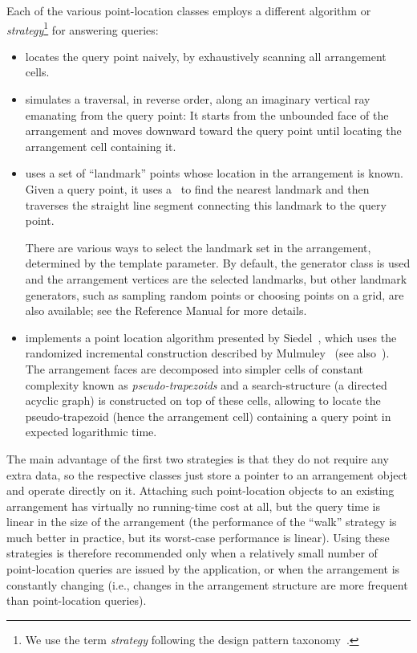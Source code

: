 Each of the various point-location classes employs a different
algorithm or {\em strategy}\footnote{We use the term {\em strategy}
following the design pattern taxonomy~\cite{cgal:ghjv-dpero-95}.}
for answering queries:
\begin{itemize}
\item {} locates the query
point naively, by exhaustively scanning all arrangement cells.
%
\item {}
simulates a traversal, in reverse order, along an imaginary vertical
ray emanating
from the query point: It starts from the unbounded face of the
arrangement and moves downward toward the query point until
locating the arrangement cell containing it.
%
\item {}
uses a set of ``landmark'' points whose location in the
arrangement is known. Given a query point, it uses a \kdtree\ to
find the nearest landmark and then traverses the straight line
segment connecting this landmark to the query point.

There are various ways to select the landmark set in the
arrangement, determined by the  template parameter.
By default, the generator
class  is used and the
arrangement vertices are the selected landmarks, but other
landmark generators, such as sampling random points or
choosing points on a grid, are also available; see the
Reference Manual for more details.
%
\item {} implements
a point location algorithm presented by Siedel~\cite{s-sfira-91}, which uses the 
randomized incremental construction described by Mulmuley~\cite{m-fppa-90} (see
also~\cite[Chapter~6]{bkos-cgaa-00}). The
arrangement faces are decomposed into simpler cells of constant
complexity known as {\em pseudo-trapezoids} and a search-structure
(a directed acyclic graph) is constructed on top of these cells,
allowing to locate the pseudo-trapezoid (hence the arrangement
cell) containing a query point in expected logarithmic time.
\end{itemize}

The main advantage of the first two strategies is that they do not
require any extra data, so the respective classes just store a
pointer to an arrangement object and operate directly on it.
Attaching such point-location objects to an existing arrangement
has virtually no running-time cost at all, but the query time is
linear in the size of the arrangement (the performance of the
``walk'' strategy is much better in practice, but its worst-case
performance is linear). Using these strategies is therefore
recommended only when a relatively small number of point-location
queries are issued by the application, or when the arrangement is
constantly changing (i.e., changes in the arrangement structure
are more frequent than point-location queries).

